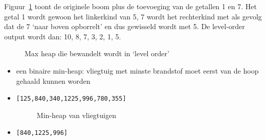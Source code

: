 \begin{Oplossing}{6.4}
Figuur~\ref{fig:levelorderheap} toont de originele boom plus de toevoeging van de getallen 1 en 7. Het getal 1 wordt gewoon het linkerkind van 5, 7 wordt het rechterkind met als gevolg dat de 7 ‘naar boven opborrelt’ en dus gewisseld wordt met 5. De level-order output wordt dan: 10, 8, 7, 3, 2, 1, 5.
\begin{figure}[htbp]
    \centering
{}
\caption{Max heap die bewandelt wordt in ‘level order’}
\label{fig:levelorderheap}
\end{figure}
\end{Oplossing}
\begin{Oplossing}{6.5}
\begin{itemize}
\item een binaire min-heap: vliegtuig met minste brandstof moet eerst van de hoop gehaald kunnen worden
\item \verb/[125,840,340,1225,996,780,355]/

\begin{figure}[htbp]
    \centering
{}
\caption{Min-heap van vliegtuigen}
\end{figure}
\item \verb/[840,1225,996]/
\end{itemize}
\end{Oplossing}
